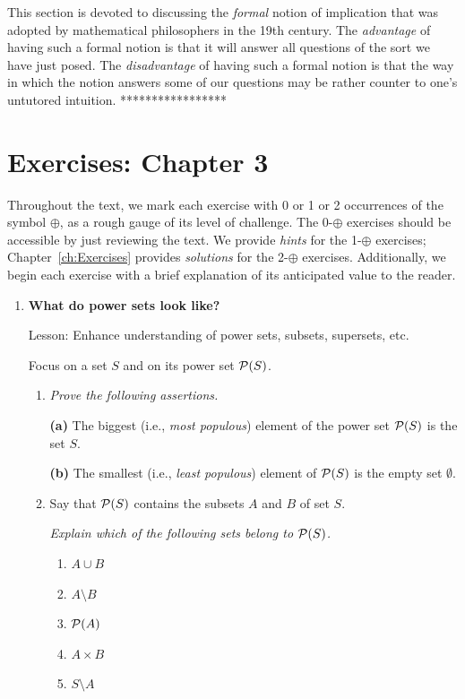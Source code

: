 {{

This section is devoted to discussing the {\em formal} notion of implication that was adopted by mathematical philosophers in the 19th century.  The {\em advantage} of having such a formal notion is that it will answer all questions of the sort we have just posed.  The {\em disadvantage} of having such a formal notion is that the way in which the notion answers some of our questions may be rather counter to one's untutored intuition.
*****************}



\section{Exercises: Chapter 3}

Throughout the text, we mark each exercise with 0 or 1 or 2 occurrences of the symbol $\oplus$, as a rough gauge of its level of challenge.  The 0-$\oplus$ exercises should be accessible by just reviewing the text.  We provide {\em hints} for the 1-$\oplus$ exercises; Chapter~\ref{ch:Exercises} provides {\em solutions} for the 2-$\oplus$ exercises.  Additionally, we begin each exercise with a brief explanation of its anticipated value to the reader.
 

\begin{enumerate}
\item
{\bf What do power sets look like?}

{\sc Lesson:} Enhance understanding of power sets, subsets, supersets, etc.

\smallskip

Focus on a set $S$ and on its power set $\mbox{$\cal P$}(S)$.
  \begin{enumerate}
  \item
{\em Prove the following assertions.}

\begin{prop}
{\bf (a)}
The biggest (i.e., {\em most populous}) element of the power set $\mbox{$\cal P$}(S)$ is the set $S$.

{\bf (b)}
The smallest (i.e., {\em least populous}) element of $\mbox{$\cal P$}(S)$ is the empty set $\emptyset$.
\end{prop}

  \medskip\item
Say that $\mbox{$\cal P$}(S)$ contains the subsets $A$ and $B$ of set $S$.

{\em Explain which of the following sets belong to $\mbox{$\cal P$}(S)$.}
\begin{enumerate}
\item
$A \cup B$
\medskip\item
$A \setminus B$
\medskip\item
$\mbox{$\cal P$}(A)$
\medskip\item
$A \times B$
\medskip\item
$S \setminus A$
\end{enumerate}
  \end{enumerate}



\end{enumerate}}
